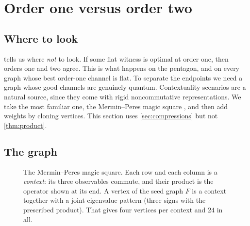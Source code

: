 \documentclass[11pt]{article}
\theoremstyle{definition}
\begin{document}
\section{Order one versus order two}\label{sec:small}

\subsection{Where to look}

 tells us where \emph{not} to look.  If some flat witness is
optimal at order one, then orders one and two agree.  This is what happens on
the pentagon, and on every graph whose best order-one channel is flat.  To
separate the endpoints we need a graph whose good channels are genuinely
quantum.  Contextuality scenarios are a natural source, since they come with
rigid noncommutative representations.  We take the most familiar one, the
Mermin--Peres magic square \cite{Mermin1990,Peres1990}, and then add weights
by cloning vertices.  This section uses \cref{sec:compressions} but not
\cref{thm:product}.

\subsection{The graph}

\begin{figure}[t]
\centering
{}
\caption{The Mermin--Peres magic square.  Each row and each column is a
\emph{context}: its three observables commute, and their product is the
operator shown at its end.  A vertex of the seed graph $F$ is a context
together with a joint eigenvalue pattern (three signs with the prescribed
product).  That gives four vertices per context and $24$ in all.}
\label{fig:magic}
\end{figure}
\end{document}
